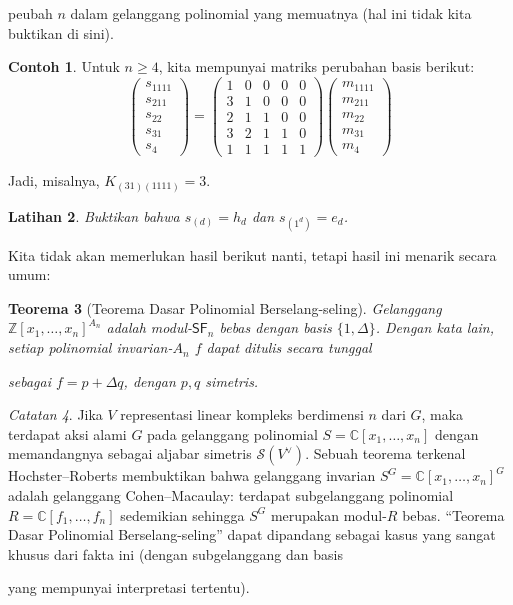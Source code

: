 \documentclass[12pt]{article}
\theoremstyle{plain}
\newtheorem{theorem}{Teorema}[section]
\newtheorem{exercise}[theorem]{Latihan}
\theoremstyle{definition}
\newtheorem{example}[theorem]{Contoh}
\theoremstyle{remark}
\newtheorem{remark}[theorem]{Catatan}
\numberwithin{equation}{section}
\begin{document}
peubah $n$ dalam gelanggang polinomial yang memuatnya
(hal ini tidak kita buktikan di sini).
\begin{example}
Untuk $n \ge 4$, kita mempunyai matriks perubahan basis berikut:
\[
\begin{pmatrix}
s_{1111}\\ s_{211} \\ s_{22}\\ s_{31}\\ s_4
\end{pmatrix}
=
\begin{pmatrix}
1 & 0 & 0 & 0 & 0\\
3 & 1 & 0 & 0 & 0\\
2 & 1 & 1 & 0 & 0\\
3 & 2 & 1 & 1 & 0\\
1 & 1 & 1 & 1 & 1
\end{pmatrix} 
\begin{pmatrix}
m_{1111}\\ m_{211} \\ m_{22}\\ m_{31}\\ m_4
\end{pmatrix}
\]

Jadi, misalnya, $K_{(31)(1111)}=3$.
\end{example}
\begin{exercise}

Buktikan bahwa $s_{(d)} = h_d$ dan $s_{(1^d)} = e_d$.

\end{exercise}
Kita tidak akan memerlukan hasil berikut nanti, tetapi hasil ini menarik secara umum:
\begin{theorem}[Teorema Dasar Polinomial Berselang-seling]
Gelanggang $\mathbb{Z}[x_1,\ldots,x_n]^{A_n}$ adalah modul-$\mathsf{SF}_n$
bebas dengan basis $\{1, \Delta\}$.
Dengan kata lain, setiap polinomial invarian-$A_n$ $f$ dapat ditulis secara tunggal

sebagai $f=p+\Delta q$, dengan $p,q$ simetris.
\end{theorem}
\begin{remark}
Jika $V$ representasi linear kompleks berdimensi $n$ dari $G$,
maka terdapat aksi alami $G$ pada gelanggang polinomial
$S=\mathbb{C}[x_1,\ldots,x_n]$ dengan memandangnya sebagai aljabar simetris
$\mathcal{S}(V^\vee)$.
Sebuah teorema terkenal Hochster--Roberts membuktikan bahwa gelanggang invarian
$S^G=\mathbb{C}[x_1,\ldots,x_n]^G$ adalah gelanggang Cohen--Macaulay:
terdapat subgelanggang polinomial $R=\mathbb{C}[f_1,\ldots,f_n]$
sedemikian sehingga $S^G$ merupakan modul-$R$ bebas.
``Teorema Dasar Polinomial Berselang-seling'' dapat dipandang sebagai
kasus yang sangat khusus dari fakta ini (dengan subgelanggang dan basis

yang mempunyai interpretasi tertentu).

\end{remark}
\end{document}
